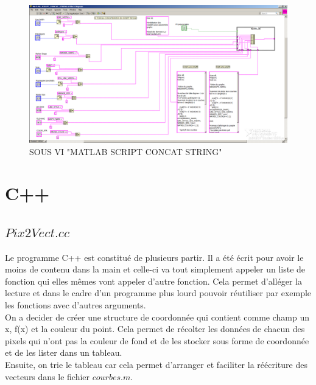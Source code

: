 \documentclass[11pt, a4paper, oneside]{article}   	%
\begin{document}
\begin{figure}[H]
\begin{center}
	\includegraphics[scale =0.4]{images/SOUS_VI_MATLAB_SCRIPT}
	\caption*{SOUS VI "MATLAB SCRIPT CONCAT STRING"}
\end{center}
\end{figure}


\clearpage
\section{C++}

\subsection{$Pix2Vect.cc$}
Le programme C++ est constitué de plusieurs partir. Il a été écrit pour avoir le moins de contenu dans la main et celle-ci va tout simplement appeler un liste de fonction qui elles mêmes vont appeler d'autre fonction. Cela permet d'alléger la lecture et dans le cadre d'un programme plus lourd pouvoir réutiliser par exemple les fonctions avec d'autres arguments.\\

On a decider de créer une structure de coordonnée qui contient comme champ un x, f(x) et la couleur du point. Cela permet de récolter les données de chacun des pixels qui n'ont pas la couleur de fond et de les stocker sous forme de coordonnée et de les lister dans un tableau.\\

Ensuite, on trie le tableau car cela permet d'arranger et faciliter la réécriture des vecteurs dans le fichier $courbes.m$. \\
\end{document}
